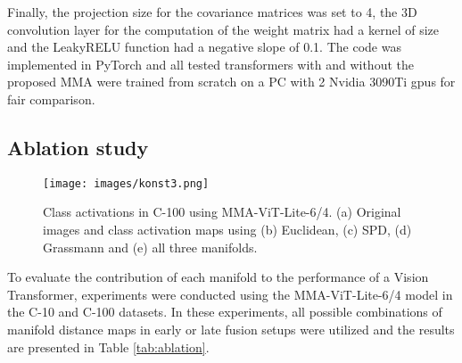 \documentclass[10pt,twocolumn,letterpaper]{article}
\begin{document}
Finally, the projection size for the covariance matrices  was set to 4, the 3D convolution layer for the computation of the weight matrix had a kernel of size  and the LeakyRELU function had a negative slope of 0.1. The code was implemented in PyTorch and all tested transformers with and without the proposed MMA were trained from scratch on a PC with 2 Nvidia 3090Ti gpus for fair comparison.

\subsection{Ablation study}
\label{sec:ablation}

\begin{figure}[t]
  \centering
  \texttt{[image: images/konst3.png]}
  \caption{Class activations in C-100 using MMA-ViT-Lite-6/4. (a) Original images and class activation maps using (b) Euclidean, (c) SPD, (d) Grassmann and (e) all three manifolds.}
  \label{fig:c100_vis}
\end{figure}

To evaluate the contribution of each manifold to the performance of a Vision Transformer, experiments were conducted using the MMA-ViT-Lite-6/4 model in the C-10 and C-100 datasets. In these experiments, all possible combinations of manifold distance maps in early or late fusion setups were utilized and the results are presented in Table \ref{tab:ablation}.
\end{document}
